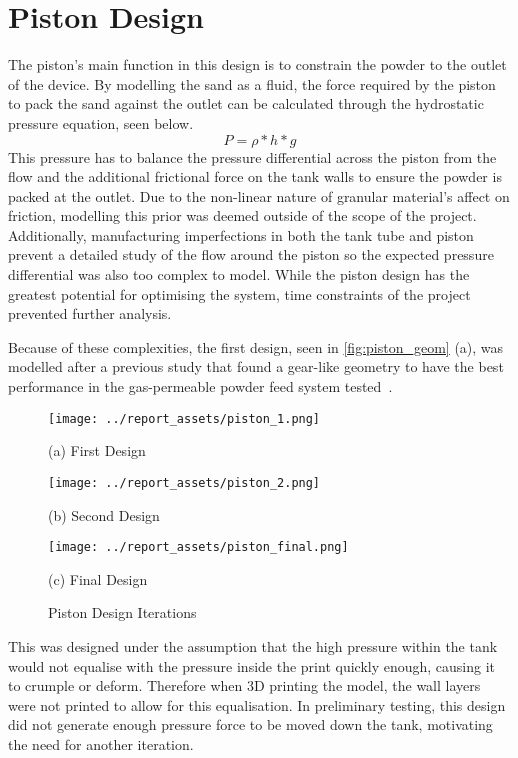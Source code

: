 \section{Piston Design}\label{sec:piston}
The piston's main function in this design is to constrain the powder to the outlet of the device. By modelling the sand as a fluid, the force required by the piston to pack the sand against the outlet can be calculated through the hydrostatic pressure equation, seen below. 
\begin{equation}\label{equ:hydrostatic}
P = \rho * h * g
\end{equation}
This pressure has to balance the pressure differential across the piston from the flow and the additional frictional force on the tank walls to ensure the powder is packed at the outlet. Due to the non-linear nature of granular material's affect on friction, modelling this prior was deemed outside of the scope of the project. Additionally, manufacturing imperfections in both the tank tube and piston prevent a detailed study of the flow around the piston so the expected pressure differential was also too complex to model. While the piston design has the greatest potential for optimising the system, time constraints of the project prevented further analysis.

Because of these complexities, the first design, seen in \autoref{fig:piston_geom} (a), was modelled after a previous study that found a gear-like geometry to have the best performance in the gas-permeable powder feed system tested~\cite{TANG2023118406}. 
\begin{figure}[htbp]
    \centering
    
    \begin{minipage}{0.3\textwidth}
        \centering
        \texttt{[image: ../report\_assets/piston\_1.png]}
        \caption*{(a) First Design}\label{fig:piston_geom_1}
    \end{minipage}
    \hfill
    \begin{minipage}{0.3\textwidth}
        \centering
        \texttt{[image: ../report\_assets/piston\_2.png]}
        \caption*{(b) Second Design}\label{fig:piston_geom_2}
    \end{minipage}
    \hfill
    \begin{minipage}{0.3\textwidth}
        \centering
        \texttt{[image: ../report\_assets/piston\_final.png]}
        \caption*{(c) Final Design}\label{fig:piston_geom_3}
    \end{minipage}
    \caption{Piston Design Iterations}\label{fig:piston_geom}
\end{figure}
This was designed under the assumption that the high pressure within the tank would not equalise with the pressure inside the print quickly enough, causing it to crumple or deform. Therefore when 3D printing the model, the wall layers were not printed to allow for this equalisation. In preliminary testing, this design did not generate enough pressure force to be moved down the tank, motivating the need for another iteration.

